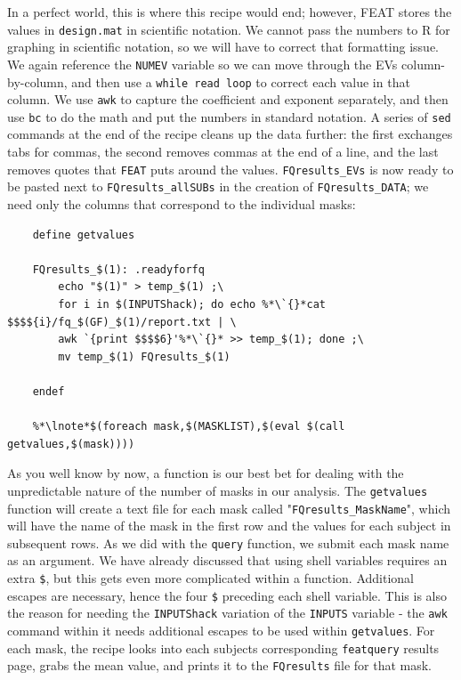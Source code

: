 In a perfect world, this is where this recipe would end; however, FEAT stores the values in \texttt{design.mat} in scientific notation. We cannot pass the numbers to R for graphing in scientific notation, so we will have to correct that formatting issue.  We again reference the \texttt{NUMEV} variable so we can move through the EVs column-by-column, and then use a \texttt{while read loop} to correct each value in that column. We use \texttt{awk} to capture the coefficient and exponent separately, and  then use \texttt{bc} to do the math and put the numbers in standard notation. A series of \texttt{sed} commands at the end of the recipe cleans up the data further: the first exchanges tabs for commas, the second removes commas at the end of a line, and the last removes quotes that \texttt{FEAT} puts around the values. \texttt{FQresults_EVs} is now ready to be pasted next to \texttt{FQresults_allSUBs} in the creation of \texttt{FQresults_DATA}; we need only the columns that correspond to the individual masks:
\begin{lstlisting}
	define getvalues
	
	FQresults_$(1): .readyforfq
		echo "$(1)" > temp_$(1) ;\
		for i in $(INPUTShack); do echo %*\`{}*cat $$$${i}/fq_$(GF)_$(1)/report.txt | \
		awk `{print $$$$6}'%*\`{}* >> temp_$(1); done ;\
		mv temp_$(1) FQresults_$(1)
		
	endef
	
	%*\lnote*$(foreach mask,$(MASKLIST),$(eval $(call getvalues,$(mask))))
\end{lstlisting}
As you well know by now, a function is our best bet for dealing with the unpredictable nature of the number of masks in our analysis. The \texttt{getvalues} function will create a text file for each mask called "\texttt{FQresults_MaskName}", which will have the name of the mask in the first row and the values for each subject in subsequent rows. As we did with the \texttt{query} function, we submit each mask name as an argument. We have already discussed that using shell variables requires an extra \texttt{\$}, but this gets even more complicated within a function. Additional escapes are necessary, hence the four \texttt{\$} preceding each shell variable.  This is also the reason for needing the \texttt{INPUTShack} variation of the \texttt{INPUTS} variable - the \texttt{awk} command within it needs additional escapes to be used within \texttt{getvalues}. For each mask, the recipe looks into each subjects corresponding \texttt{featquery} results page, grabs the mean value, and prints it to the \texttt{FQresults} file for that mask.

